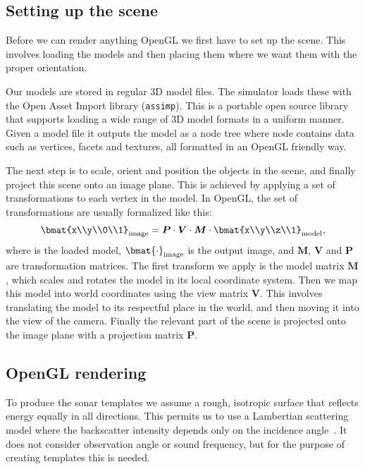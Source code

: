 \documentclass[
   UAM                                          %
 , 12pt                                         %
 , bibtex                                       %
 , layout
]{common/mytemplate}
\newcommand\mat[1]{\boldsymbol{#1}}
\renewcommand*\P{\mat P}
\newcommand*\V{\mat V}
\newcommand*\M{\mat M}
\begin{document}
\subsection{Setting up the scene}

Before we can render anything OpenGL we first have to set up the scene. This involves loading the models and then placing them where we want them with the proper orientation. 

Our models are stored in regular 3D model files. The simulator loads these with the Open Asset Import library (\texttt{assimp}). This is a portable open source library that supports loading a wide range of 3D model formats in a uniform manner. Given a model file it outputs the model as a node tree where node contains data such as vertices, facets and textures, all formatted in an OpenGL friendly way.

The next step is to scale, orient and position the objects in the scene, and finally project this scene onto an image plane. This is achieved by applying a set of transformations to each vertex in the model. In OpenGL, the set of transformations are usually formalized like this:
\begin{align*}
\bmat{x\\y\\0\\1}_\text{image} = \P \cdot \V \cdot \M \cdot \bmat{x\\y\\z\\1}_\text{model},
\end{align*}
where is the loaded model, $\bmat{\cdot}_\text{image}$ is the output image, and $\M$, $\V$ and $\P$ are transformation matrices. The first transform we apply is the model matrix $\M$, which scales and rotates the model in its local coordinate system. Then we map this model into world coordinates using the view matrix $\V$. This involves translating the model to its respectful place in the world, and then moving it into the view of the camera. Finally the relevant part of the scene is projected onto the image plane with a projection matrix $\P$. 

\subsection{OpenGL rendering}

To produce the sonar templates we assume a rough, isotropic surface that reflects energy equally in all directions. This permits us to use a Lambertian scattering model where the backscatter intensity depends only on the incidence angle~\cite{Zhang1999}. It does not consider observation angle or sound frequency, but for the purpose of creating templates this is needed.   
\end{document}
